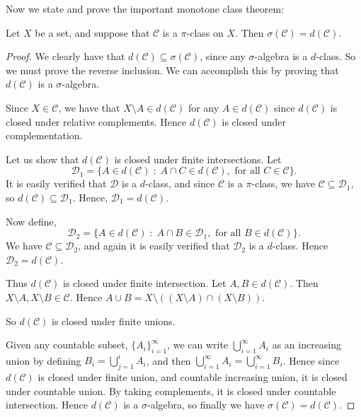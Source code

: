 \documentclass{owmaths}
\begin{document}
Now we state and prove the important monotone class theorem:
\begin{theorem}
    Let $X$ be a set, and suppose that $\mathcal{C}$ is a $\pi$-class
    on $X$. Then $\sigma(\mathcal{C}) = d(\mathcal{C})$.
\end{theorem}
\begin{proof}
    We clearly have that $d(\mathcal{C}) \subseteq \sigma(\mathcal{C})$,
    since any $\sigma$-algebra is a $d$-class. So we must prove
    the reverse inclusion. We can accomplish this by proving that $d(\mathcal{C})$
    is a $\sigma$-algebra. 
    
    Since $X \in \mathcal{C}$, we have that $X \setminus A \in d(\mathcal{C})$
    for any $A \in d(\mathcal{C})$ since $d(\mathcal{C})$ is closed under
    relative complements. Hence $d(\mathcal{C})$ is closed under complementation.
    
    Let us show that $d(\mathcal{C})$ is closed under finite intersections. Let
    \begin{equation*}
        \mathcal{D}_1 = \{A \in d(\mathcal{C}) \;:\;A\cap C \in d(\mathcal{C}),\text{ for all }C \in \mathcal{C}\}.
    \end{equation*}
    It is easily verified that $\mathcal{D}$ is a $d$-class, and since $\mathcal{C}$ is a $\pi$-class, we
    have $\mathcal{C} \subseteq \mathcal{D}_1$, so $d(\mathcal{C}) \subseteq \mathcal{D}_1$.
    Hence, $\mathcal{D}_1 = d(\mathcal{C})$.
    
    Now define,
    \begin{equation*}
        \mathcal{D}_2 = \{A \in d(\mathcal{C})\;:\;A\cap B \in \mathcal{D}_1,\text{ for all }B \in d(\mathcal{C})\}.
    \end{equation*}
    We have $\mathcal{C} \subseteq \mathcal{D}_2$, and again it is easily
    verified that $\mathcal{D}_2$ is a $d$-class. Hence $\mathcal{D}_2 = d(\mathcal{C})$.
    
    Thus $d(\mathcal{C})$ is closed under finite intersection. Let $A,B \in d(\mathcal{C})$. 
    Then $X \setminus A,X\setminus B \in \mathcal{C}$. Hence $A \cup B = X\setminus ((X\setminus A)\cap (X\setminus B))$.
    
    So $d(\mathcal{C})$ is closed under finite unions.
    
    Given any countable subset, $\{A_i\}_{i=1}^\infty$, we can write $\bigcup_{i=1}^\infty A_i$
    as an increasing union by defining $B_i = \bigcup_{j=1}^i A_i$, and then
    $\bigcup_{i=1}^\infty A_i = \bigcup_{i=1}^\infty B_i$. Hence
    since $d(\mathcal{C})$ is closed under finite union, and countable increasing union,
    it is closed under countable union. By taking complements, it is closed
    under countable intersection. Hence $d(\mathcal{C})$ is a $\sigma$-algebra,
    so finally we have $\sigma(\mathcal{C}) = d(\mathcal{C})$.
\end{proof}
\end{document}
